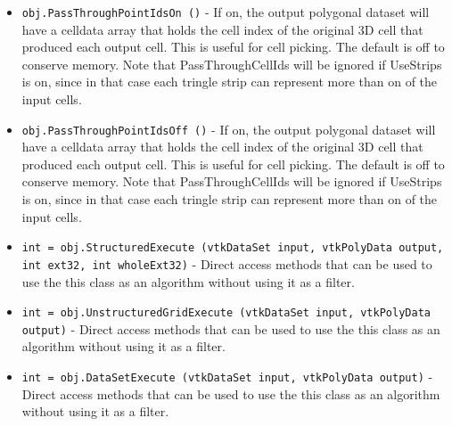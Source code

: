 \begin{itemize}
\item  \verb|obj.PassThroughPointIdsOn ()| -  If on, the output polygonal dataset will have a celldata array that 
 holds the cell index of the original 3D cell that produced each output
 cell. This is useful for cell picking. The default is off to conserve 
 memory. Note that PassThroughCellIds will be ignored if UseStrips is on,
 since in that case each tringle strip can represent more than on of the
 input cells.

\item  \verb|obj.PassThroughPointIdsOff ()| -  If on, the output polygonal dataset will have a celldata array that 
 holds the cell index of the original 3D cell that produced each output
 cell. This is useful for cell picking. The default is off to conserve 
 memory. Note that PassThroughCellIds will be ignored if UseStrips is on,
 since in that case each tringle strip can represent more than on of the
 input cells.

\item  \verb|int = obj.StructuredExecute (vtkDataSet input, vtkPolyData output, int ext32, int wholeExt32)| -  Direct access methods that can be used to use the this class as an
 algorithm without using it as a filter.

\item  \verb|int = obj.UnstructuredGridExecute (vtkDataSet input, vtkPolyData output)| -  Direct access methods that can be used to use the this class as an
 algorithm without using it as a filter.

\item  \verb|int = obj.DataSetExecute (vtkDataSet input, vtkPolyData output)| -  Direct access methods that can be used to use the this class as an
 algorithm without using it as a filter.

\end{itemize}
